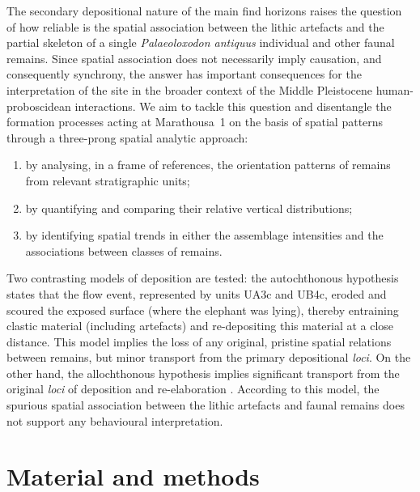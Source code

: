 \documentclass[preprint,authoryear,times]{elsarticle} %
\begin{document}
The secondary depositional nature of the main find horizons raises the question of how reliable is the spatial association between the lithic artefacts and the partial skeleton of a single \emph{Palaeoloxodon antiquus} individual and other faunal remains. Since spatial association does not necessarily imply causation, and consequently synchrony, the answer has important consequences for the interpretation of the site in the broader context of the Middle Pleistocene human-proboscidean interactions. We aim to tackle this question and disentangle the formation processes acting at Marathousa~1 on the basis of spatial patterns through a three-prong spatial analytic approach:
\begin{enumerate}
\item by analysing, in a frame of references, the orientation patterns of remains from relevant stratigraphic units;
\item by quantifying and comparing their relative vertical distributions;
\item by identifying spatial trends in either the assemblage intensities and the associations between classes of remains.
\end{enumerate}

Two contrasting models of deposition are tested: the autochthonous hypothesis \citep[\emph{sensu}][]{Fernandez-Lopez1991,Dominguez-Rodrigo2012} states that the flow event, represented by units UA3c and UB4c, eroded and scoured the exposed surface (where the elephant was lying), thereby entraining clastic material (including artefacts) and re-depositing \citep[\emph{sensu}][]{Fernandez-Lopez1991} this material at a close distance. This model implies the loss of any original, pristine spatial relations between remains, but minor transport from the primary depositional \emph{loci}. On the other hand, the allochthonous hypothesis \citep[\emph{sensu}][]{Fernandez-Lopez1991,Dominguez-Rodrigo2012} implies significant transport from the original \emph{loci} of deposition and re-elaboration \citep[\emph{sensu}][]{Fernandez-Lopez1991}. According to this model, the spurious spatial association between the lithic artefacts and faunal remains does not support any behavioural interpretation.

\section{Material and methods}
\end{document}
